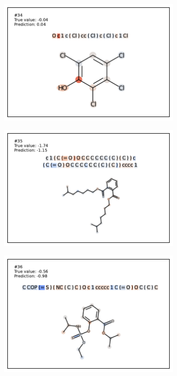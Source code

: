 \begin{figure}
\begin{subfigure}[b]{0.33\textwidth}
\end{subfigure}\begin{subfigure}[b]{0.33\textwidth} 
  \centering 
  \includegraphics[width=\textwidth]{figures/esol/esol34.pdf} 
\end{subfigure}
\begin{subfigure}[b]{0.33\textwidth} 
  \centering 
  \includegraphics[width=\textwidth]{figures/esol/esol35.pdf} 
\end{subfigure}\begin{subfigure}[b]{0.33\textwidth} 
  \centering 
  \includegraphics[width=\textwidth]{figures/esol/esol36.pdf} 

\end{subfigure}
\end{figure}
